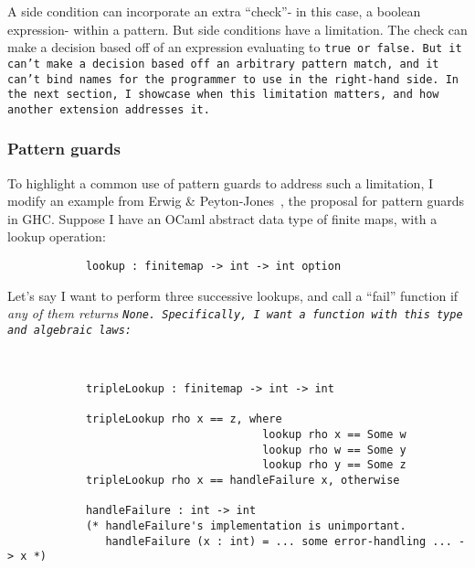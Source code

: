 \documentclass[manuscript,screen,review, 12pt, nonacm]{acmart}
\begin{document}
    A side condition can incorporate an extra “check”- in this case, a boolean
    expression- within a pattern. But side conditions have a limitation. The
    check can make a decision based off of an expression evaluating to \tt{true}
    or \tt{false}. But it can't make a decision based off an arbitrary pattern
    match, and it can't bind names for the programmer to use in the right-hand
    side. In the next section, I showcase when this limitation matters, and how
    another extension addresses it. 

    \subsubsection{Pattern guards}
    \label{guards}

    To highlight a common use of pattern guards to address such a limitation, I
    modify an example from Erwig \& Peyton-Jones~\cite{guardproposal}, the
    proposal for pattern guards in GHC. Suppose I have an OCaml abstract data
    type of finite maps, with a lookup operation: 

    \begin{minipage}[t]{\textwidth}
        \centering 
        \begin{verbatim}
            lookup : finitemap -> int -> int option
        \end{verbatim}
    \end{minipage}
    Let's say I want to perform three successive lookups, and call a “fail”
    function if \it{any} of them returns \tt{None}. Specifically, I want a
    function with this type and algebraic laws: 

    \begin{minipage}[t]{\textwidth}
        \centering 
        \begin{verbatim}
          

            tripleLookup : finitemap -> int -> int

            tripleLookup rho x == z, where 
                                       lookup rho x == Some w
                                       lookup rho w == Some y
                                       lookup rho y == Some z
            tripleLookup rho x == handleFailure x, otherwise
            
            handleFailure : int -> int 
            (* handleFailure's implementation is unimportant.
               handleFailure (x : int) = ... some error-handling ... -> x *)  

        \end{verbatim}
    \end{minipage}
\end{document}
